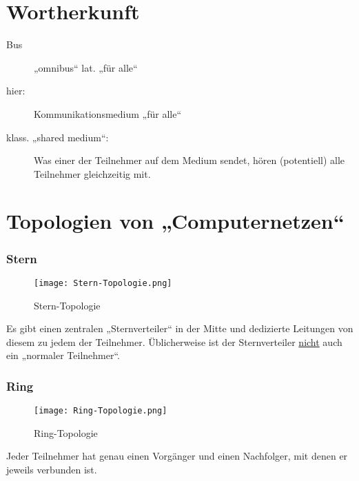 


\section{Wortherkunft}
\label{sec:wortherkunft}

\begin{description}
\item[Bus] „omnibus“ lat. „für alle“
\item[hier:] Kommunikationsmedium „für alle“
\item[klass. „shared medium“:] Was einer der Teilnehmer auf dem Medium sendet, hören (potentiell) alle Teilnehmer gleichzeitig mit.
\end{description}



\section{Topologien von „Computernetzen“}
\label{sec:topologien}

\subsubsection{Stern}
\begin{figure}[htbp]
  \centering
  \texttt{[image: Stern-Topologie.png]}
  \caption{Stern-Topologie}
\end{figure}
Es gibt einen zentralen „Sternverteiler“ in der Mitte und dedizierte Leitungen von diesem zu jedem der Teilnehmer. Üblicherweise ist der Sternverteiler \underline{nicht} auch ein „normaler Teilnehmer“.\\

\subsubsection{Ring}
\begin{figure}[htbp]
  \centering
  \texttt{[image: Ring-Topologie.png]}
  \caption{Ring-Topologie}
\end{figure}
Jeder Teilnehmer hat genau einen Vorgänger und einen Nachfolger, mit denen er jeweils verbunden ist.

